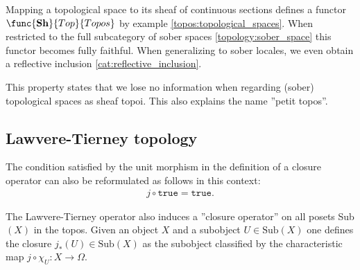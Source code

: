     \begin{property}
        Mapping a topological space to its sheaf of continuous sections defines a functor $\func{\mathbf{Sh}}{Top}{Topos}$ by example \ref{topos:topological_spaces}. When restricted to the full subcategory of sober spaces \ref{topology:sober_space} this functor becomes fully faithful. When generalizing to sober locales, we even obtain a reflective inclusion \ref{cat:reflective_inclusion}.

        This property states that we lose no information when regarding (sober) topological spaces as sheaf topoi. This also explains the name ''petit topos''.
    \end{property}

\subsection{Lawvere-Tierney topology}

    \begin{remark}
        The condition satisfied by the unit morphism in the definition of a closure operator can also be reformulated as follows in this context:
        \begin{gather}
            j\circ\texttt{true} = \texttt{true}.
        \end{gather}
    \end{remark}
    The Lawvere-Tierney operator also induces a ''closure operator'' on all posets Sub$(X)$ in the topos. Given an object $X$ and a subobject $U\in\text{Sub}(X)$ one defines the closure $j_\ast(U)\in\text{Sub}(X)$ as the subobject classified by the characteristic map $j\circ\chi_U:X\rightarrow\Omega$.

